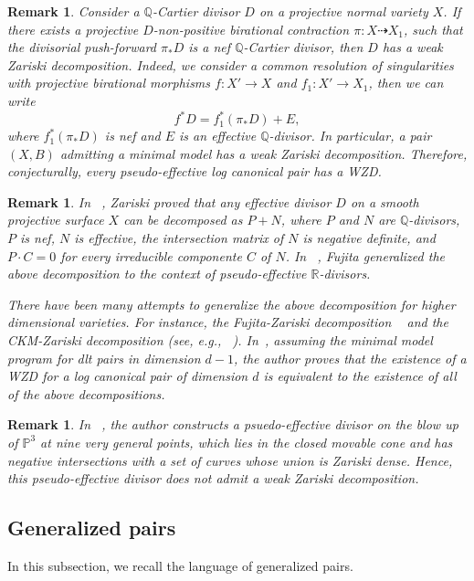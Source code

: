 \documentclass{amsart}
\renewcommand{\qq}{\mathbb{Q}}
\newcommand{\rr}{\mathbb{R}}
\newtheorem{remark}[theorem]{Remark}
\theoremstyle{remark}
\numberwithin{equation}{section}
\begin{document}
\begin{remark}{\em
Consider a $\qq$-Cartier divisor $D$ on a projective normal variety $X$.
If there exists a projective $D$-non-positive birational contraction $\pi\colon X\dashrightarrow X_1$,
such that the divisorial push-forward $\pi_*D$ is a nef $\qq$-Cartier divisor,  
then $D$ has a weak Zariski decomposition. 
Indeed, we consider a common resolution of singularities with
projective birational morphisms $f\colon X'\rightarrow X$ and $f_1\colon X'\rightarrow X_1$, 
then we can write 
\[
f^*D= f_1^*(\pi_*D)+E,
\]
where $f_1^*(\pi_*D)$ is nef and $E$ is an effective $\qq$-divisor. 
In particular, a pair $(X,B )$ admitting a minimal model has a weak Zariski decomposition.
Therefore, conjecturally, every pseudo-effective log canonical pair has a WZD.}
\end{remark}

\begin{remark}{\em 
In ~\cite{Zar62}, Zariski proved that any effective divisor $D$ on a smooth projective surface $X$
can be decomposed as $P+N$, where $P$ and $N$ are $\qq$-divisors, $P$ is nef, $N$ is effective, 
the intersection matrix of $N$ is negative definite, and $P\cdot C=0$ for every irreducible componente $C$ of $N$.
In ~\cite{Fuj79}, Fujita generalized the above decomposition to the context of pseudo-effective $\rr$-divisors.

There have been many attempts to generalize the above decomposition for  higher dimensional varieties.
For instance, the Fujita-Zariski decomposition ~\cite{Fuj86} and the CKM-Zariski decomposition (see, e.g., ~\cite{Pro04}).
In~\cite{Bir12a}, assuming the minimal model program for dlt pairs in dimension $d-1$, 
the author proves that the existence of a WZD for a log canonical pair of dimension $d$ is equivalent to the existence of all of the above decompositions.}
\end{remark}

\begin{remark}{\em 
In ~\cite{Les14}, the author constructs a psuedo-effective divisor on the blow up of $\mathbb{P}^3$
at nine very general points, which lies in the closed movable cone and has negative intersections with a set
of curves whose union is Zariski dense. Hence, this pseudo-effective divisor does not admit a weak Zariski decomposition. 
}
\end{remark}

\subsection{Generalized pairs}
In this subsection, we recall the language of generalized pairs.
\end{document}
